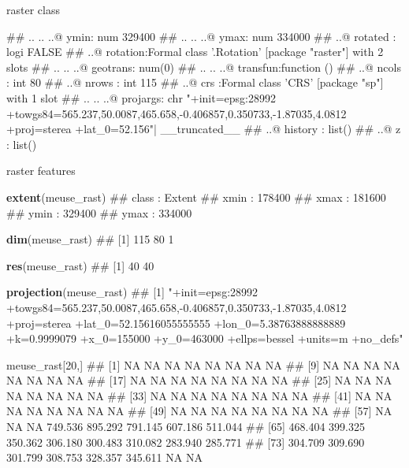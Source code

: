 \documentclass[11pt,ignorenonframetext,]{beamer}
\newenvironment{Shaded}{}{}
\newcommand{\DecValTok}[1]{\textcolor[rgb]{0.25,0.63,0.44}{#1}}
\newcommand{\KeywordTok}[1]{\textcolor[rgb]{0.00,0.44,0.13}{\textbf{#1}}}
\newcommand{\NormalTok}[1]{#1}
\let\oldShaded\Shaded
\let\endoldShaded\endShaded
\renewenvironment{Shaded}{\footnotesize\begin{spacing}{0.9}\oldShaded}{\endoldShaded\end{spacing}}
\let\oldverbatim\verbatim
\let\endoldverbatim\endverbatim
\newcommand{\scriptoutput}{
  \renewenvironment{Shaded}{\scriptsize\begin{spacing}{0.9}\oldShaded}{\endoldShaded\end{spacing}}
  \renewenvironment{verbatim}{\scriptsize\begin{spacing}{0.9}\oldverbatim}{\endoldverbatim\end{spacing}}
}
\begin{document}
\begin{frame}[fragile]{raster class}
\begin{Shaded}
\begin{Highlighting}[]
\NormalTok{##   .. .. ..@ ymin: num 329400}
\NormalTok{##   .. .. ..@ ymax: num 334000}
\NormalTok{##   ..@ rotated : logi FALSE}
\NormalTok{##   ..@ rotation:Formal class '.Rotation' [package "raster"] with 2 slots}
\NormalTok{##   .. .. ..@ geotrans: num(0) }
\NormalTok{##   .. .. ..@ transfun:function ()  }
\NormalTok{##   ..@ ncols   : int 80}
\NormalTok{##   ..@ nrows   : int 115}
\NormalTok{##   ..@ crs     :Formal class 'CRS' [package "sp"] with 1 slot}
\NormalTok{##   .. .. ..@ projargs: chr "+init=epsg:28992 +towgs84=565.237,50.0087,465.658,-0.406857,0.350733,-1.87035,4.0812 +proj=sterea +lat_0=52.156"| __truncated__}
\NormalTok{##   ..@ history : list()}
\NormalTok{##   ..@ z       : list()}
\end{Highlighting}
\end{Shaded}

\end{frame}

\begin{frame}[fragile,t]{raster features}
\protect\hypertarget{raster-features}{}

\scriptoutput

\begin{Shaded}
\begin{Highlighting}[]
\KeywordTok{extent}\NormalTok{(meuse_rast)}
\NormalTok{## class       : Extent }
\NormalTok{## xmin        : 178400 }
\NormalTok{## xmax        : 181600 }
\NormalTok{## ymin        : 329400 }
\NormalTok{## ymax        : 334000}

\KeywordTok{dim}\NormalTok{(meuse_rast)}
\NormalTok{## [1] 115  80   1}

\KeywordTok{res}\NormalTok{(meuse_rast)}
\NormalTok{## [1] 40 40}

\KeywordTok{projection}\NormalTok{(meuse_rast)}
\NormalTok{## [1] "+init=epsg:28992 +towgs84=565.237,50.0087,465.658,-0.406857,0.350733,-1.87035,4.0812 +proj=sterea +lat_0=52.15616055555555 +lon_0=5.38763888888889 +k=0.9999079 +x_0=155000 +y_0=463000 +ellps=bessel +units=m +no_defs"}

\NormalTok{meuse_rast[}\DecValTok{20}\NormalTok{,]}
\NormalTok{##  [1]      NA      NA      NA      NA      NA      NA      NA      NA}
\NormalTok{##  [9]      NA      NA      NA      NA      NA      NA      NA      NA}
\NormalTok{## [17]      NA      NA      NA      NA      NA      NA      NA      NA}
\NormalTok{## [25]      NA      NA      NA      NA      NA      NA      NA      NA}
\NormalTok{## [33]      NA      NA      NA      NA      NA      NA      NA      NA}
\NormalTok{## [41]      NA      NA      NA      NA      NA      NA      NA      NA}
\NormalTok{## [49]      NA      NA      NA      NA      NA      NA      NA      NA}
\NormalTok{## [57]      NA      NA      NA 749.536 895.292 791.145 607.186 511.044}
\NormalTok{## [65] 468.404 399.325 350.362 306.180 300.483 310.082 283.940 285.771}
\NormalTok{## [73] 304.709 309.690 301.799 308.753 328.357 345.611      NA      NA}
\end{Highlighting}
\end{Shaded}

\end{frame}
\end{document}
